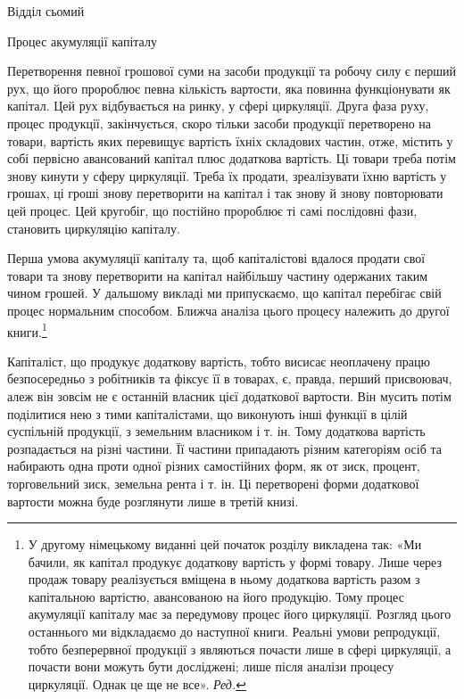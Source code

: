Відділ сьомий

Процес акумуляції капіталу

Перетворення певної грошової суми на засоби продукції та
робочу силу є перший рух, що його пророблює певна кількість
вартости, яка повинна функціонувати як капітал. Цей рух відбувається
на ринку, у сфері циркуляції. Друга фаза руху, процес
продукції, закінчується, скоро тільки засоби продукції
перетворено на товари, вартість яких перевищує вартість їхніх
складових частин, отже, містить у собі первісно авансований
капітал плюс додаткова вартість. Ці товари треба потім знову
кинути у сферу циркуляції. Треба їх продати, зреалізувати їхню
вартість у грошах, ці гроші знову перетворити на капітал і
так знову й знову повторювати цей процес. Цей кругобіг, що
постійно пророблює ті самі послідовні фази, становить циркуляцію
капіталу.

Перша умова акумуляції капіталу та, щоб капіталістові вдалося
продати свої товари та знову перетворити на капітал найбільшу
частину одержаних таким чином грошей. У дальшому
викладі ми припускаємо, що капітал перебігає свій процес нормальним
способом. Ближча аналіза цього процесу належить до
другої книги.\footnote*{
У другому німецькому виданні цей початок розділу викладена
так: «Ми бачили, як капітал продукує додаткову вартість у формі товару.
Лише через продаж товару реалізується вміщена в ньому додаткова
вартість разом з капітальною вартістю, авансованою на його продукцію.
Тому процес акумуляції капіталу має за передумову процес його циркуляції.
Розгляд цього останнього ми відкладаємо до наступної книги.
Реальні умови репродукції, тобто безперервної продукції з являються
почасти лише в сфері циркуляції, а почасти вони можуть бути досліджені;
лише після аналізи процесу циркуляції. Однак це ще не все». \emph{Ред.}
}

Капіталіст, що продукує додаткову вартість, тобто висисає
неоплачену працю безпосередньо з робітників та фіксує її в товарах,
є, правда, перший присвоювач, алеж він зовсім не є
останній власник цієї додаткової вартости. Він мусить потім
поділитися нею з тими капіталістами, що виконують інші функції
в цілій суспільній продукції, з земельним власником і т. ін.
Тому додаткова вартість розпадається на різні частини. Її частини
припадають різним категоріям осіб та набирають одна проти
одної різних самостійних форм, як от зиск, процент, торговельний
зиск, земельна рента і т. ін. Ці перетворені форми додаткової
вартости можна буде розглянути лише в третій книзі.